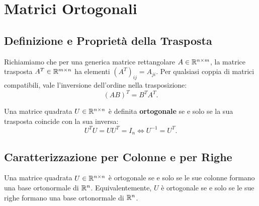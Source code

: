 \FloatBarrier
\section{Matrici Ortogonali}

\subsection{Definizione e Propriet\`a della Trasposta}

Richiamiamo che per una generica matrice rettangolare $A \in \mathbb{R}^{n \times m}$, la matrice trasposta $A^T \in \mathbb{R}^{m \times n}$ ha elementi $(A^T)_{ij} = A_{ji}$. Per qualsiasi coppia di matrici compatibili, vale l'inversione dell'ordine nella trasposizione:
\begin{equation}
    (AB)^T = B^T A^T.
\end{equation}

\begin{definition}
Una matrice quadrata $U \in \mathbb{R}^{n \times n}$ \`e definita \textbf{ortogonale} se e solo se la sua trasposta coincide con la sua inversa:
\begin{equation}
    U^T U = U U^T = I_n \iff U^{-1} = U^T.
\end{equation}
\end{definition}

\subsection{Caratterizzazione per Colonne e per Righe}

\begin{theorem}
Una matrice quadrata $U \in \mathbb{R}^{n \times n}$ \`e ortogonale se e solo se le sue colonne formano una base ortonormale di $\mathbb{R}^n$. Equivalentemente, $U$ \`e ortogonale se e solo se le sue righe formano una base ortonormale di $\mathbb{R}^n$.
\end{theorem}


